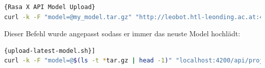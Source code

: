 \begin{lstlisting}[language=bash,label={lst:uploadlatestmodelshdefault},caption={Befehl zum Model Upload von Rasa X }]{Rasa X API Model Upload}
curl -k -F "model=@my_model.tar.gz" "http://leobot.htl-leonding.ac.at:4200/api/projects/default/models?api_token=TOKEN"
\end{lstlisting}

Dieser Befehl wurde angepasst sodass er immer das neuste Model hochlädt:

\begin{lstlisting}[language=bash,label={lst:uploadlatestmodelsh},caption={upload-latest-model.sh}]{upload-latest-model.sh}]
curl -k -F "model=@$(ls -t *tar.gz | head -1)" "localhost:4200/api/projects/default/models?api_token=TOKEN"
\end{lstlisting}

